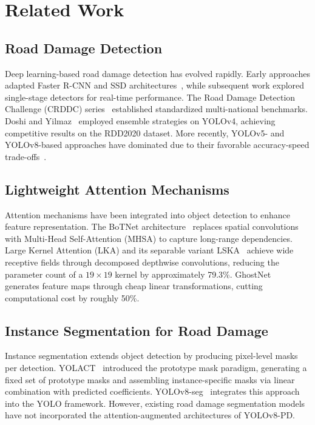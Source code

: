 \documentclass[conference]{IEEEtran}
\begin{document}
\section{Related Work}
\label{sec:related}

\subsection{Road Damage Detection}
Deep learning-based road damage detection has evolved rapidly. Early approaches adapted Faster R-CNN and SSD architectures~\cite{maeda2018rdd}, while subsequent work explored single-stage detectors for real-time performance. The Road Damage Detection Challenge (CRDDC) series~\cite{arya2022rdd2022} established standardized multi-national benchmarks. Doshi and Yilmaz~\cite{doshi2020rdd} employed ensemble strategies on YOLOv4, achieving competitive results on the RDD2020 dataset. More recently, YOLOv5- and YOLOv8-based approaches have dominated due to their favorable accuracy-speed trade-offs~\cite{jocher2023yolov8}.

\subsection{Lightweight Attention Mechanisms}
Attention mechanisms have been integrated into object detection to enhance feature representation. The BoTNet architecture~\cite{srinivas2021botnet} replaces spatial convolutions with Multi-Head Self-Attention (MHSA) to capture long-range dependencies. Large Kernel Attention (LKA) and its separable variant LSKA~\cite{li2023lska} achieve wide receptive fields through decomposed depthwise convolutions, reducing the parameter count of a $19\times19$ kernel by approximately 79.3\%. GhostNet~\cite{han2020ghostnet} generates feature maps through cheap linear transformations, cutting computational cost by roughly 50\%.

\subsection{Instance Segmentation for Road Damage}
Instance segmentation extends object detection by producing pixel-level masks per detection. YOLACT~\cite{bolya2019yolact} introduced the prototype mask paradigm, generating a fixed set of prototype masks and assembling instance-specific masks via linear combination with predicted coefficients. YOLOv8-seg~\cite{jocher2023yolov8} integrates this approach into the YOLO framework. However, existing road damage segmentation models have not incorporated the attention-augmented architectures of YOLOv8-PD.
\end{document}
